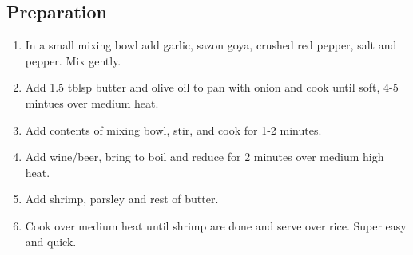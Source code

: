 \subsection{Preparation}
\begin{enumerate}
    \item In a small mixing bowl add garlic, sazon goya, crushed red pepper, salt and pepper. Mix gently.
    \item Add 1.5 tblsp butter and olive oil to pan with onion and cook until soft, 4-5 mintues over medium heat.
    \item Add contents of mixing bowl, stir, and cook for 1-2 minutes.
    \item Add wine/beer, bring to boil and reduce for 2 minutes over medium high heat.
    \item Add shrimp, parsley and rest of butter.
    \item Cook over medium heat until shrimp are done and serve over rice. Super easy and quick.
\end{enumerate}
